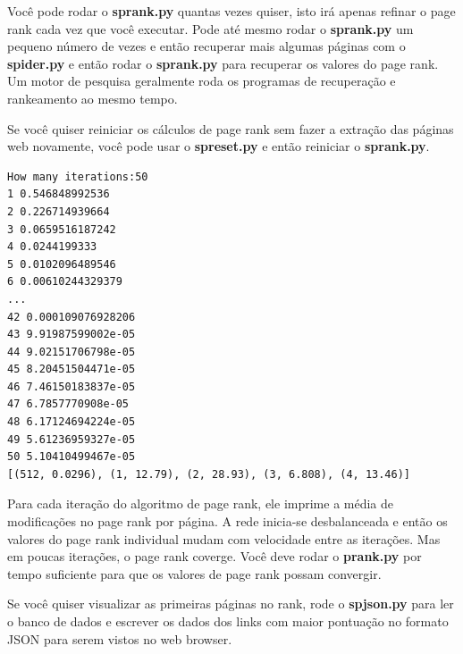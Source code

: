 Você pode rodar o {\bf sprank.py} quantas vezes quiser, isto irá apenas refinar
o page rank cada vez que você executar. Pode até mesmo rodar o {\bf sprank.py} um
pequeno número de vezes e então recuperar mais algumas páginas com o {\bf spider.py} 
e então rodar o {\bf sprank.py} para recuperar os valores do page rank. Um motor de
pesquisa geralmente roda os programas de recuperação e rankeamento ao mesmo tempo.

Se você quiser reiniciar os cálculos de page rank sem fazer a extração das páginas
web novamente, você pode usar o {\bf spreset.py} e então reiniciar o {\bf sprank.py}.

\beforeverb
\begin{verbatim}
How many iterations:50
1 0.546848992536
2 0.226714939664
3 0.0659516187242
4 0.0244199333
5 0.0102096489546
6 0.00610244329379
...
42 0.000109076928206
43 9.91987599002e-05
44 9.02151706798e-05
45 8.20451504471e-05
46 7.46150183837e-05
47 6.7857770908e-05
48 6.17124694224e-05
49 5.61236959327e-05
50 5.10410499467e-05
[(512, 0.0296), (1, 12.79), (2, 28.93), (3, 6.808), (4, 13.46)]
\end{verbatim}
\afterverb
%

Para cada iteração do algoritmo de page rank, ele imprime a média
de modificações no page rank por página. A rede inicia-se
desbalanceada e então os valores do page rank individual mudam
com velocidade entre as iterações. Mas em poucas iterações, o page rank 
coverge. Você deve rodar o {\bf prank.py} por tempo suficiente para
que os valores de page rank possam convergir.

Se você quiser visualizar as primeiras páginas no rank, rode o {\bf spjson.py}
para ler o banco de dados e escrever os dados dos links com maior pontuação
no formato JSON para serem vistos no web browser.

